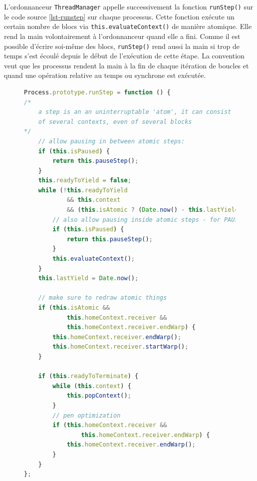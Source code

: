 L'ordonnanceur \texttt{ThreadManager} appelle successivement la fonction \texttt{runStep()} sur le code source \ref{lst-runstep} sur chaque processus. Cette fonction exécute un certain nombre de blocs via \texttt{this.evaluateContext()} de manière atomique. Elle rend la main volontairement à l'ordonnanceur quand elle a fini. Comme il est possible d'écrire soi-même des blocs, \texttt{runStep()} rend aussi la main si trop de temps s'est écoulé depuis le début de l'exécution de cette étape. La convention veut que les processus rendent la main à la fin de chaque itération de boucles et quand une opération relative au temps ou synchrone est exécutée.
\begin{figure}
\begin{lstlisting}[caption={Fonction \texttt{runStep()} de \texttt{Process}},label=lst-runstep,language=JavaScript]
Process.prototype.runStep = function () {
/*
    a step is an an uninterruptable 'atom', it can consist
    of several contexts, even of several blocks
*/
    // allow pausing in between atomic steps:
    if (this.isPaused) {
        return this.pauseStep();
    }
    this.readyToYield = false;
    while (!this.readyToYield
            && this.context
            && (this.isAtomic ? (Date.now() - this.lastYield < this.timeout) : true) ) {
        // also allow pausing inside atomic steps - for PAUSE block primitive:
        if (this.isPaused) {
            return this.pauseStep();
        }
        this.evaluateContext();
    }
    this.lastYield = Date.now();

    // make sure to redraw atomic things
    if (this.isAtomic &&
            this.homeContext.receiver &&
            this.homeContext.receiver.endWarp) {
        this.homeContext.receiver.endWarp();
        this.homeContext.receiver.startWarp();
    }

    if (this.readyToTerminate) {
        while (this.context) {
            this.popContext();
        }
        // pen optimization
        if (this.homeContext.receiver &&
                this.homeContext.receiver.endWarp) {
            this.homeContext.receiver.endWarp();
        }
    }
};
\end{lstlisting}
\end{figure}


